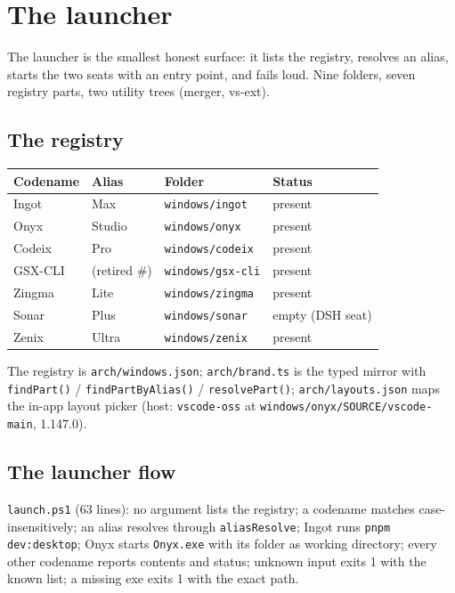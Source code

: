 \chapter{The launcher}

The launcher is the smallest honest surface: it lists the registry, resolves an alias, starts
the two seats with an entry point, and fails loud. Nine folders, seven registry parts, two
utility trees (merger, vs-ext).

\section{The registry}

\begin{tabular}{@{}llll@{}}
\toprule
Codename & Alias & Folder & Status\\
\midrule
Ingot & Max & \texttt{windows/ingot} & present\\
Onyx & Studio & \texttt{windows/onyx} & present\\
Codeix & Pro & \texttt{windows/codeix} & present\\
GSX-CLI & (retired \#) & \texttt{windows/gsx-cli} & present\\
Zingma & Lite & \texttt{windows/zingma} & present\\
Sonar & Plus & \texttt{windows/sonar} & empty (DSH seat)\\
Zenix & Ultra & \texttt{windows/zenix} & present\\
\bottomrule
\end{tabular}

\medskip
The registry is \texttt{arch/windows.json}; \texttt{arch/brand.ts} is the typed mirror with
\texttt{findPart()} / \texttt{findPartByAlias()} / \texttt{resolvePart()};
\texttt{arch/layouts.json} maps the in-app layout picker (host: \texttt{vscode-oss} at
\texttt{windows/onyx/SOURCE/vscode-main}, 1.147.0).

\section{The launcher flow}

\texttt{launch.ps1} (63 lines): no argument lists the registry; a codename matches
case-insensitively; an alias resolves through \texttt{aliasResolve}; Ingot runs
\texttt{pnpm dev:desktop}; Onyx starts \texttt{Onyx.exe} with its folder as working directory;
every other codename reports contents and status; unknown input exits 1 with the known list;
a missing exe exits 1 with the exact path.

